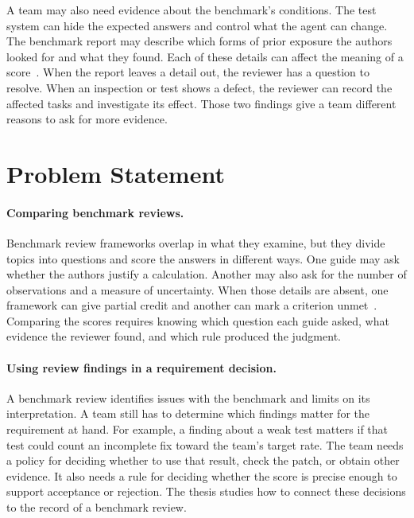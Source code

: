 A team may also need evidence about the benchmark's conditions. The test system can hide the expected answers and control what the agent can change. The benchmark report may describe which forms of prior exposure the authors looked for and what they found. Each of these details can affect the meaning of a score~\cite{reuel_betterbench,zhu_agentic_benchmark_checklist_2025,nist_ai_800_2_2026}. When the report leaves a detail out, the reviewer has a question to resolve. When an inspection or test shows a defect, the reviewer can record the affected tasks and investigate its effect. Those two findings give a team different reasons to ask for more evidence.

\section{Problem Statement}
\label{sec:intro_problem}

\paragraph{Comparing benchmark reviews.}
Benchmark review frameworks overlap in what they examine, but they divide topics into questions and score the answers in different ways. One guide may ask whether the authors justify a calculation. Another may also ask for the number of observations and a measure of uncertainty. When those details are absent, one framework can give partial credit and another can mark a criterion unmet~\cite{reuel_betterbench,liu_ecbd_2024,san_joaquin_scorecard_2026}. Comparing the scores requires knowing which question each guide asked, what evidence the reviewer found, and which rule produced the judgment.

\paragraph{Using review findings in a requirement decision.}
A benchmark review identifies issues with the benchmark and limits on its interpretation. A team still has to determine which findings matter for the requirement at hand. For example, a finding about a weak test matters if that test could count an incomplete fix toward the team's target rate. The team needs a policy for deciding whether to use that result, check the patch, or obtain other evidence. It also needs a rule for deciding whether the score is precise enough to support acceptance or rejection. The thesis studies how to connect these decisions to the record of a benchmark review.

